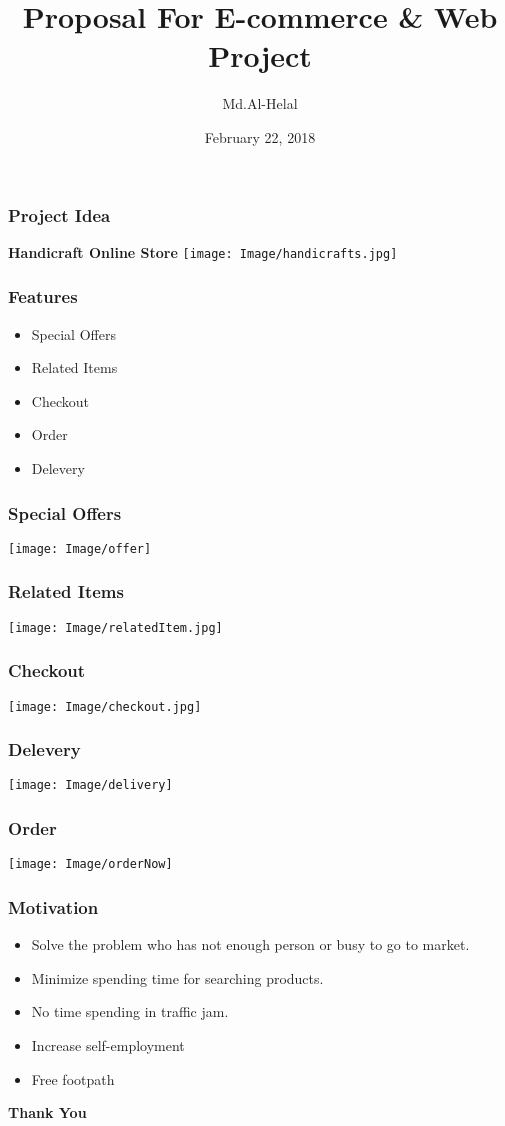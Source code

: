 \documentclass[usenames,dvipsnames]{beamer}
\begin{document}
\author{Md.Al-Helal}
\title{Proposal For E-commerce \& Web Project}
\date{February 22, 2018}
\begin{frame}
  \maketitle
\end{frame}
\begin{frame}
  \frametitle{Project Idea}
  \centering
  \Huge \textbf{Handicraft Online Store}
  \vspace{5cm}
  \texttt{[image: Image/handicrafts.jpg]}
\end{frame}
\begin{frame}
  \frametitle{Features}
  \begin{itemize}
    \item Special Offers
    \item Related Items
    \item Checkout
    \item Order
    \item Delevery
  \end{itemize}
\end{frame}
\begin{frame}
  \frametitle{Special Offers}
  \begin{center}
  \texttt{[image: Image/offer]}
\end{center}
\end{frame}
\begin{frame}
  \frametitle{Related Items}
  \texttt{[image: Image/relatedItem.jpg]}
\end{frame}
\begin{frame}
  \frametitle{Checkout}
  \texttt{[image: Image/checkout.jpg]}
\end{frame}
\begin{frame}
  \frametitle{Delevery}
  \texttt{[image: Image/delivery]}
\end{frame}
\begin{frame}
  \frametitle{Order}
  \texttt{[image: Image/orderNow]}
\end{frame}
\begin{frame}
  \frametitle{Motivation} 
  \begin{itemize}
    \item Solve the problem who has not enough person or busy to go to market.
    \item Minimize spending time for searching products.
    \item No time spending in traffic jam.
    \item Increase self-employment
    \item Free footpath
  \end{itemize}
\end{frame}
\begin{frame}
  \color{Brown}
  \centering
  \Huge \textbf{Thank You}
\end{frame}
\end{document}
